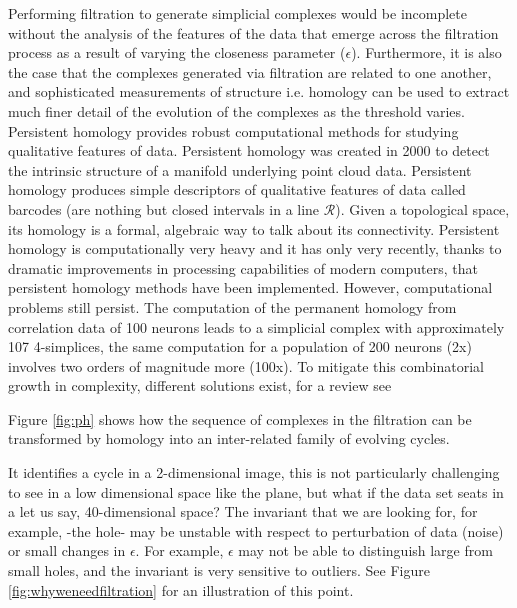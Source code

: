 \documentclass[onecollarge,runningheads]{svjour2}
\begin{document}
Performing filtration to generate simplicial complexes would be incomplete without the analysis of the features of the data that emerge across the filtration process as a result of varying the closeness parameter ($\epsilon$). Furthermore,  it is also the case that the complexes generated via filtration are related to one another, and sophisticated measurements of structure i.e. homology can be used to extract much finer detail of the evolution of the complexes as the threshold varies. 
Persistent homology provides robust computational methods for studying qualitative features of data. Persistent homology was created in 2000 to detect the intrinsic structure of a manifold underlying point cloud data. Persistent homology produces simple descriptors of qualitative features of data called barcodes (are nothing but closed intervals in a line $\mathcal{R}$). Given a topological space, its homology is a formal, algebraic way to talk about its connectivity. 
Persistent homology is computationally very heavy and it has only very recently, thanks to dramatic improvements in processing capabilities of modern computers, that persistent homology methods have been implemented.
However, computational problems still persist. The computation of the permanent homology from correlation data of 100 neurons leads to a simplicial complex with approximately 107 4-simplices, the same computation for a population of 200 neurons (2x) involves two orders of magnitude more (100x).
To mitigate this combinatorial growth in complexity, different solutions exist, for a review see \cite{otter2015roadmap}




Figure \ref{fig:ph} shows how the sequence of complexes in the filtration can be transformed by homology into an inter-related family of evolving cycles.





 It identifies a cycle in a 2-dimensional image, this is not particularly challenging to see in a low dimensional space like the plane, but what if the data set seats in a let us say, 40-dimensional space? 
The invariant that we are looking for, for example, -the hole- may be unstable with respect to perturbation of data (noise) or small changes in $\epsilon$. For example, $\epsilon$ may not be able to distinguish large from small holes, and the invariant is very sensitive to outliers. See Figure \ref{fig:whyweneedfiltration} for an illustration of this point.
\end{document}
